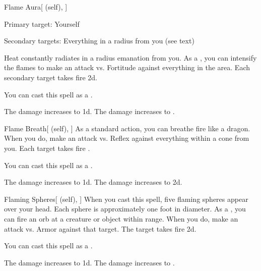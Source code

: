 \lowercase{\hypertarget{spell:Flame Aura}{}}\label{spell:Flame Aura}
\begin{attuneability}[Rank 4]{\hypertarget{spell:Flame Aura}{Flame Aura}}[ (self), ]

Primary target: Yourself
\par\noindent
Secondary targets: Everything in a \areasmall radius from you (see text)

Heat constantly radiates in a \areasmall radius emanation from you.
As a , you can intensify the flames to make an attack vs. Fortitude against everything in the area.
\hit Each secondary target takes fire  \minus2d.

You can cast this spell as a .

\rankline
{} The damage increases to  \minus1d.
 The damage increases to .

\end{attuneability}
\vspace{0.25em}



\lowercase{\hypertarget{spell:Flame Breath}{}}\label{spell:Flame Breath}
\begin{attuneability}[Rank 4]{\hypertarget{spell:Flame Breath}{Flame Breath}}[ (self), ]
As a standard action, you can breathe fire like a dragon.
When you do, make an attack vs. Reflex against everything within a \arealarge cone from you.
\hit Each target takes fire .

You can cast this spell as a .

\rankline
{} The damage increases to  \plus1d.
 The damage increases to  \plus2d.

\end{attuneability}
\vspace{0.25em}



\lowercase{\hypertarget{spell:Flaming Spheres}{}}\label{spell:Flaming Spheres}
\begin{attuneability}[Rank 4]{\hypertarget{spell:Flaming Spheres}{Flaming Spheres}}[ (self), ]
When you cast this spell, five flaming spheres appear over your head.
Each sphere is approximately one foot in diameter.
As a , you can fire an orb at a creature or object within \rngclose range.
When you do, make an attack vs. Armor against that target.
\hit The target takes fire  \minus2d.

You can cast this spell as a .

\rankline
{} The damage increases to  \minus1d.
 The damage increases to .

\end{attuneability}
\vspace{0.25em}




